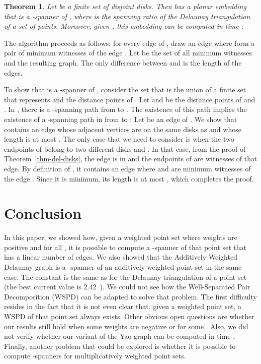 \documentclass[pdftex,leqno,fleqn,12pt]{article}
\newtheorem{theorem}{Theorem}[section]
\newenvironment{proof}{{\textit Proof:} \rm}{\hfill  \medskip\\}
\begin{document}
{\begin{theorem}\label{reverse-prop} Let  be a finite set of disjoint disks.
Then  has a planar embedding that is a -spanner of , where 
is the spanning ratio of the Delaunay triangulation of a set of points. Moreover, given
, this embedding can be computed in time .
\end{theorem}
\begin{proof} The algorithm proceeds as follows: for every edge  of ,
draw an edge  where  form a pair of minimum witnesses of the edge .
Let  be the set of all minimum witnesses and  the resulting graph. The only difference
between  and  is the length of the edges.

To show that  is a -spanner of , consider the set  that is the union of a
finite set that represents  and the distance points of . Let
 and  be the distance points of  and . In ,
there is a -spanning path  from  to . The existence of this path implies the
existence of a -spanning path in  from  to : Let  be an edge of . We show
that  contains an edge whose adjacent vertices are on the same disks as  and whose length is
at most . The only case that we need to consider is when the two endpoints of  belong to
two different disks  and . In that case, from the proof of Theorem~\ref{thm-del-disks},
the edge  is in  and the endpoints of  are witnesses of that edge.
By definition of , it contains an edge  where  and  are minimum witnesses
of the edge . Since it is minimum, its length is at most , which completes the
proof.
\end{proof}

}

\section{Conclusion}\label{section-disk-del-conclusion}

In this paper, we showed how, given a weighted point set where weights are positive and
 for all , it is possible to compute a -spanner of
that point set that has a linear number of edges. We also showed that the Additively Weighted
Delaunay graph is a -spanner of an additively weighted point set in the same case. The constant
 is the same as for the Delaunay triangulation of a point set (the best current value is
2.42~\cite{keil92}). We could not see how the Well-Separated Pair Decomposition (WSPD) can be
adapted to solve that problem. The first difficulty resides in the fact that it is not even clear
that, given a weighted point set, a WSPD of that point set always exists. Other obvious open
questions are whether our results still hold when some weights are negative or 
for some . Also, we did not verify whether our variant of the Yao graph can be computed in
time . Finally, another problem that could be explored is whether it is possible to
compute -spanners for multiplicatively weighted point sets.



\end{document}
